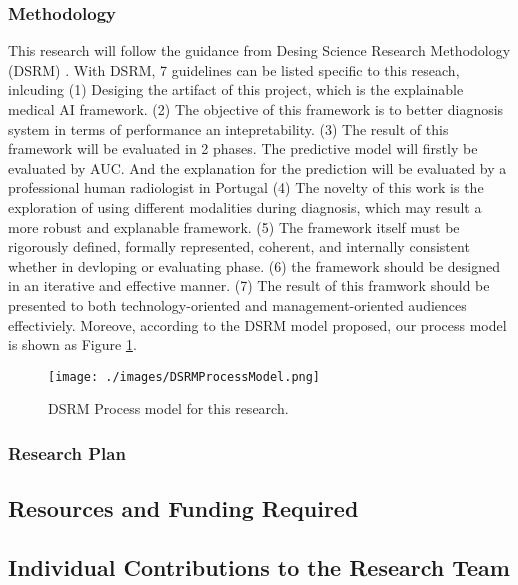 \subsubsection{Methodology}
This research will follow the guidance from Desing Science Research Methodology (DSRM) \citep{Hevner2004DSRM}. With DSRM, 7 guidelines can be listed specific to this reseach, inlcuding (1) Desiging the artifact of this project, which is the explainable medical AI framework. (2) The objective of this framework is to better diagnosis system in terms of performance an intepretability. (3) The result of this framework will be evaluated in 2 phases. The predictive model will firstly be evaluated by AUC. And the explanation for the prediction will be evaluated by a professional human radiologist in Portugal (4) The novelty of this work is the exploration of using different modalities during diagnosis, which may result a more robust and explanable framework. (5) The framework itself must be rigorously defined, formally represented, coherent, and internally consistent whether in devloping or evaluating phase. (6) the framework should be designed in an iterative and effective manner. (7) The result of this framwork should be presented to both technology-oriented and management-oriented audiences effectiviely. Moreove, according to the DSRM model \citep{Peffers2007DSRMForIS} proposed, our process model is shown as Figure \ref{fig: DSRMProcessModel}.


\begin{figure}[!h]
    \centering
    \texttt{[image: ./images/DSRMProcessModel.png]}
    \caption{DSRM Process model for this research.}
    \label{fig: DSRMProcessModel}
\end{figure}

\subsubsection{Research Plan}


\subsection{Resources and Funding Required}


\subsection{Individual Contributions to the Research Team}

